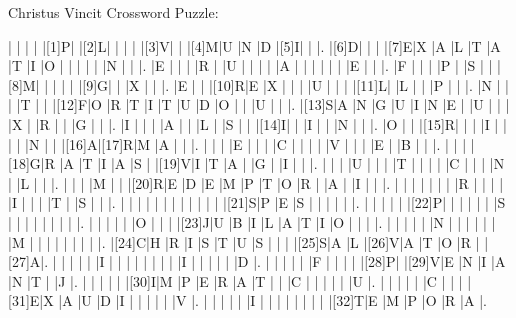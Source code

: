 \documentclass[12pt]{article}
\begin{document}
\libertine
\renewcommand\PuzzleClueFont{\rm\normalsize}

\begin{center}
  \huge{Christus Vincit Crossword Puzzle:}
\end{center}
\vspace{1.5cm}
\begin{Puzzle}{22}{25}
  |{}  |{}  |{}  |{}  |[1]P|{}  |[2]L|{}  |{}  |{}  |{}  |[3]V|{}  |{}  |[4]M|U   |N   |D   |[5]I|{}  |{}  |.
  |[6]D|{}  |{}  |{}  |[7]E|X   |A   |L   |T   |A   |T   |I   |O   |{}  |{}  |{}  |{}  |{}  |N   |{}  |{}  |.
  |E   |{}  |{}  |{}  |R   |{}  |U   |{}  |{}  |{}  |{}  |A   |{}  |{}  |{}  |{}  |{}  |{}  |E   |{}  |{}  |.
  |F   |{}  |{}  |{}  |P   |{}  |S   |{}  |{}  |[8]M|{}  |{}  |{}  |{}  |{}  |[9]G|{}  |{}  |X   |{}  |{}  |.
  |E   |{}  |{}  |[10]R|E   |X   |{}  |{}  |{}  |U   |{}  |{}  |{}  |[11]L|{}  |L   |{}  |{}  |P   |{}  |{}  |.
  |N   |{}  |{}  |{}  |T   |{}  |{}  |[12]F|O   |R   |T   |I   |T   |U   |D   |O   |{}  |{}  |U   |{}  |{}  |.
  |[13]S|A   |N   |G   |U   |I   |N   |E   |{}  |U   |{}  |{}  |{}  |X   |{}  |R   |{}  |{}  |G   |{}  |{}  |.
  |I   |{}  |{}  |{}  |A   |{}  |{}  |L   |{}  |S   |{}  |{}  |[14]I|{}  |{}  |I   |{}  |{}  |N   |{}  |{}  |.
  |O   |{}  |{}  |[15]R|{}  |{}  |{}  |I   |{}  |{}  |{}  |{}  |N   |{}  |{}  |[16]A|[17]R|M   |A   |{}  |{}  |.
  |{}  |{}  |{}  |E   |{}  |{}  |{}  |C   |{}  |{}  |{}  |{}  |V   |{}  |{}  |{}  |E   |{}  |B   |{}  |{}  |.
  |{}  |{}  |{}  |[18]G|R   |A   |T   |I   |A   |S   |{}  |[19]V|I   |T   |A   |{}  |G   |{}  |I   |{}  |{}  |.
  |{}  |{}  |{}  |U   |{}  |{}  |{}  |T   |{}  |{}  |{}  |{}  |C   |{}  |{}  |{}  |N   |{}  |L   |{}  |{}  |.
  |{}  |{}  |{}  |M   |{}  |{}  |[20]R|E   |D   |E   |M   |P   |T   |O   |R   |{}  |A   |{}  |I   |{}  |{}  |.
  |{}  |{}  |{}  |{}  |{}  |{}  |{}  |R   |{}  |{}  |{}  |{}  |I   |{}  |{}  |{}  |T   |{}  |S   |{}  |{}  |.
  |{}  |{}  |{}  |{}  |{}  |{}  |{}  |{}  |{}  |{}  |{}  |{}  |[21]S|P   |E   |S   |{}  |{}  |{}  |{}  |{}  |.
  |{}  |{}  |{}  |{}  |{}  |[22]P|{}  |{}  |{}  |{}  |{}  |{}  |S   |{}  |{}  |{}  |{}  |{}  |{}  |{}  |{}  |.
  |{}  |{}  |{}  |{}  |{}  |O   |{}  |{}  |{}  |[23]J|U   |B   |I   |L   |A   |T   |I   |O   |{}  |{}  |{}  |.
  |{}  |{}  |{}  |{}  |{}  |N   |{}  |{}  |{}  |{}  |{}  |{}  |M   |{}  |{}  |{}  |{}  |{}  |{}  |{}  |{}  |.
  |[24]C|H   |R   |I   |S   |T   |U   |S   |{}  |{}  |{}  |[25]S|A   |L   |[26]V|A   |T   |O   |R   |{}  |[27]A|.
  |{}  |{}  |{}  |{}  |{}  |I   |{}  |{}  |{}  |{}  |{}  |{}  |{}  |{}  |I   |{}  |{}  |{}  |{}  |{}  |D   |.
  |{}  |{}  |{}  |{}  |{}  |F   |{}  |{}  |{}  |{}  |[28]P|{}  |[29]V|E   |N   |I   |A   |N   |T   |{}  |J   |.
  |{}  |{}  |{}  |{}  |{}  |[30]I|M   |P   |E   |R   |A   |T   |{}  |{}  |C   |{}  |{}  |{}  |{}  |{}  |U   |.
  |{}  |{}  |{}  |{}  |{}  |C   |{}  |{}  |{}  |[31]E|X   |A   |U   |D   |I   |{}  |{}  |{}  |{}  |{}  |V   |.
  |{}  |{}  |{}  |{}  |{}  |I   |{}  |{}  |{}  |{}  |{}  |{}  |{}  |{}  |[32]T|E   |M   |P   |O   |R   |A   |.
\end{Puzzle}
\end{document}
